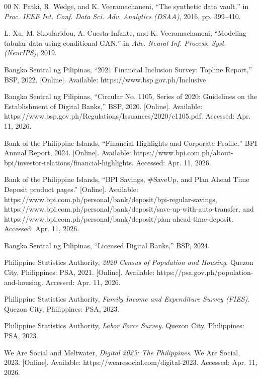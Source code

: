 \documentclass[journal]{./IEEE/IEEEtran}
\begin{document}
\begin{thebibliography}{00}
 N. Patki, R. Wedge, and K. Veeramachaneni, ``The synthetic data vault,'' in \emph{Proc. IEEE Int. Conf. Data Sci. Adv. Analytics (DSAA)}, 2016, pp. 399--410.

 L. Xu, M. Skoularidou, A. Cuesta-Infante, and K. Veeramachaneni, ``Modeling tabular data using conditional GAN,'' in \emph{Adv. Neural Inf. Process. Syst. (NeurIPS)}, 2019.

 Bangko Sentral ng Pilipinas, ``2021 Financial Inclusion Survey: Topline Report,'' BSP, 2022. [Online]. Available: https://www.bsp.gov.ph/Inclusive%

 Bangko Sentral ng Pilipinas, ``Circular No. 1105, Series of 2020: Guidelines on the Establishment of Digital Banks,'' BSP, 2020. [Online]. Available: https://www.bsp.gov.ph/Regulations/Issuances/2020/c1105.pdf. Accessed: Apr. 11, 2026.

 Bank of the Philippine Islands, ``Financial Highlights and Corporate Profile,'' BPI Annual Report, 2024. [Online]. Available: https://www.bpi.com.ph/about-bpi/investor-relations/financial-highlights. Accessed: Apr. 11, 2026.

 Bank of the Philippine Islands, ``BPI Savings, \#SaveUp, and Plan Ahead Time Deposit product pages.'' [Online]. Available: https://www.bpi.com.ph/personal/bank/deposit/bpi-regular-savings, https://www.bpi.com.ph/personal/bank/deposit/save-up-with-auto-transfer, and https://www.bpi.com.ph/personal/bank/deposit/plan-ahead-time-deposit. Accessed: Apr. 11, 2026.

 Bangko Sentral ng Pilipinas, ``Licensed Digital Banks,'' BSP, 2024.

 Philippine Statistics Authority, \emph{2020 Census of Population and Housing}. Quezon City, Philippines: PSA, 2021. [Online]. Available: https://psa.gov.ph/population-and-housing. Accessed: Apr. 11, 2026.

 Philippine Statistics Authority, \emph{Family Income and Expenditure Survey (FIES)}. Quezon City, Philippines: PSA, 2023.

 Philippine Statistics Authority, \emph{Labor Force Survey}. Quezon City, Philippines: PSA, 2023.

 We Are Social and Meltwater, \emph{Digital 2023: The Philippines}. We Are Social, 2023. [Online]. Available: https://wearesocial.com/digital-2023. Accessed: Apr. 11, 2026.


\end{thebibliography}
\end{document}
